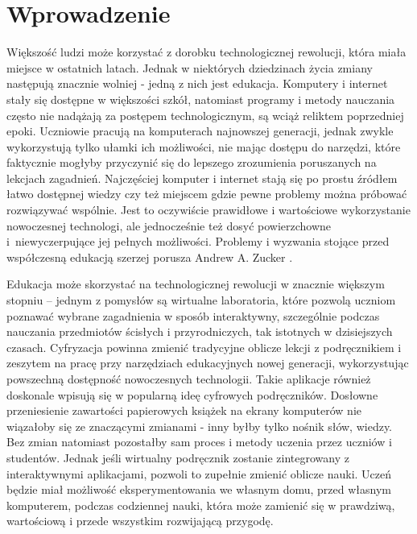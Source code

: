 \chapter{Wprowadzenie}
\label{cha:wprowadzenie}

Większość ludzi może korzystać z dorobku technologicznej rewolucji, która
miała miejsce w ostatnich latach. Jednak w niektórych dziedzinach życia zmiany
następują znacznie wolniej - jedną z nich jest edukacja. Komputery i internet
stały się dostępne w większości szkół, natomiast programy i metody nauczania
często nie nadążają za postępem technologicznym, są wciąż reliktem poprzedniej
epoki. Uczniowie pracują na komputerach najnowszej generacji, jednak zwykle
wykorzystują tylko ułamki ich możliwości, nie mając dostępu do narzędzi, które
faktycznie mogłyby przyczynić się do lepszego zrozumienia poruszanych na
lekcjach zagadnień. Najczęściej komputer i internet stają się po prostu
źródłem łatwo dostępnej wiedzy czy też miejscem gdzie pewne problemy można
próbować rozwiązywać wspólnie. Jest to oczywiście prawidłowe i wartościowe
wykorzystanie nowoczesnej technologi, ale jednocześnie też dosyć powierzchowne
i~niewyczerpujące jej pełnych możliwości. Problemy i wyzwania stojące przed
współczesną edukacją szerzej porusza Andrew A. Zucker \cite{Zuc2009}.

Edukacja może skorzystać na technologicznej rewolucji w znacznie większym
stopniu -- jednym z pomysłów są wirtualne laboratoria, które pozwolą uczniom
poznawać wybrane zagadnienia w sposób interaktywny, szczególnie podczas
nauczania przedmiotów ścisłych i przyrodniczych, tak istotnych w dzisiejszych
czasach. Cyfryzacja powinna zmienić tradycyjne oblicze lekcji z podręcznikiem
i zeszytem na pracę przy narzędziach edukacyjnych nowej generacji,
wykorzystując powszechną dostępność nowoczesnych technologii. Takie aplikacje
również doskonale wpisują się w popularną ideę cyfrowych podręczników.
Dosłowne przeniesienie zawartości papierowych książek na ekrany komputerów nie
wiązałoby się ze znaczącymi zmianami - inny byłby tylko nośnik słów, wiedzy.
Bez zmian natomiast pozostałby sam proces i metody uczenia przez uczniów i
studentów. Jednak jeśli wirtualny podręcznik zostanie zintegrowany z
interaktywnymi aplikacjami, pozwoli to zupełnie zmienić oblicze nauki. Uczeń
będzie miał możliwość eksperymentowania we własnym domu, przed własnym
komputerem, podczas codziennej nauki, która może zamienić się w prawdziwą,
wartościową i przede wszystkim rozwijającą przygodę.

